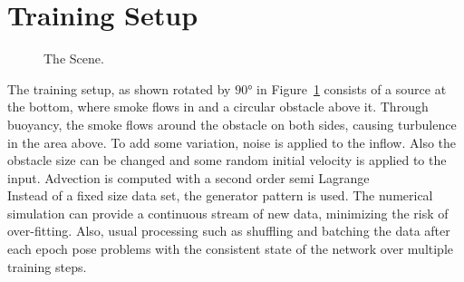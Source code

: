 \documentclass[sigconf]{acmart}
\begin{document}
\section{Training Setup}
\begin{figure}
	\caption{The Scene.}
	\label{trainingScene}
\end{figure}
The training setup, as shown rotated by $\ang{90}$ in Figure~\ref{trainingScene} consists of a source at the bottom, where smoke flows in and a circular obstacle above it. Through buoyancy, the smoke flows around the obstacle on both sides, causing turbulence in the area above. To add some variation, noise is applied to the inflow. Also the obstacle size can be changed and some random initial velocity is applied to the input.
Advection is computed with a second order semi Lagrange \\
Instead of a fixed size data set, the generator pattern is used. The numerical simulation can provide a continuous stream of new data, minimizing the risk of over-fitting. Also, usual processing such as shuffling and batching the data after each epoch pose problems with the consistent state of the network over multiple training steps.
\end{document}
